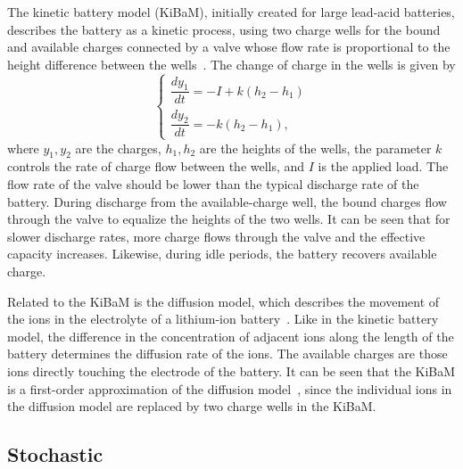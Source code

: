 \documentclass[../zhang_thesis.tex]{subfiles}
\begin{document}
The kinetic battery model (KiBaM), initially created for large lead-acid batteries, describes the battery as a kinetic process, using two charge wells for the bound and available charges connected by a valve whose flow rate is proportional to the height difference between the wells~\cite{manwell93}. The change of charge in the wells is given by
\begin{equation}
    \begin{cases}
        \dfrac{dy_1}{dt} = -I + k \left( h_2 - h_1 \right) \\
        \dfrac{dy_2}{dt} = -k \left( h_2 - h_1 \right),
    \end{cases}
    \label{eq:kibam}
\end{equation}
where $y_1,y_2$ are the charges, $h_1,h_2$ are the heights of the wells, the parameter $k$ controls the rate of charge flow between the wells, and $I$ is the applied load. The flow rate of the valve should be lower than the typical discharge rate of the battery. During discharge from the available-charge well, the bound charges flow through the valve to equalize the heights of the two wells. It can be seen that for slower discharge rates, more charge flows through the valve and the effective
capacity increases. Likewise, during idle periods, the battery recovers available charge.

Related to the KiBaM is the diffusion model, which describes the movement of the ions in the electrolyte of a lithium-ion battery~\cite{rakhmatov01}. Like in the kinetic battery model, the difference in the concentration of adjacent ions along the length of the battery determines the diffusion rate of the ions. The available charges are those ions directly touching the electrode of the battery. It can be seen that the KiBaM is a first-order approximation of the diffusion
model~\cite{jongerden09}, since the individual ions in the diffusion model are replaced by two charge wells in the KiBaM.

\subsection{Stochastic}
\end{document}
